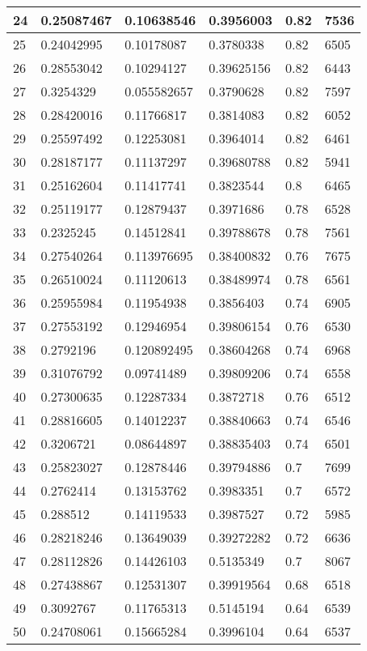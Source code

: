 \begin{longtable}{|l|l|l|l|l|l|}
24 & 0.25087467 & 0.10638546 & 0.3956003 & 0.82 & 7536 \\ \hline 
25 & 0.24042995 & 0.10178087 & 0.3780338 & 0.82 & 6505 \\ \hline 
26 & 0.28553042 & 0.10294127 & 0.39625156 & 0.82 & 6443 \\ \hline 
27 & 0.3254329 & 0.055582657 & 0.3790628 & 0.82 & 7597 \\ \hline 
28 & 0.28420016 & 0.11766817 & 0.3814083 & 0.82 & 6052 \\ \hline 
29 & 0.25597492 & 0.12253081 & 0.3964014 & 0.82 & 6461 \\ \hline 
30 & 0.28187177 & 0.11137297 & 0.39680788 & 0.82 & 5941 \\ \hline 
31 & 0.25162604 & 0.11417741 & 0.3823544 & 0.8 & 6465 \\ \hline 
32 & 0.25119177 & 0.12879437 & 0.3971686 & 0.78 & 6528 \\ \hline 
33 & 0.2325245 & 0.14512841 & 0.39788678 & 0.78 & 7561 \\ \hline 
34 & 0.27540264 & 0.113976695 & 0.38400832 & 0.76 & 7675 \\ \hline 
35 & 0.26510024 & 0.11120613 & 0.38489974 & 0.78 & 6561 \\ \hline 
36 & 0.25955984 & 0.11954938 & 0.3856403 & 0.74 & 6905 \\ \hline 
37 & 0.27553192 & 0.12946954 & 0.39806154 & 0.76 & 6530 \\ \hline 
38 & 0.2792196 & 0.120892495 & 0.38604268 & 0.74 & 6968 \\ \hline 
39 & 0.31076792 & 0.09741489 & 0.39809206 & 0.74 & 6558 \\ \hline 
40 & 0.27300635 & 0.12287334 & 0.3872718 & 0.76 & 6512 \\ \hline 
41 & 0.28816605 & 0.14012237 & 0.38840663 & 0.74 & 6546 \\ \hline 
42 & 0.3206721 & 0.08644897 & 0.38835403 & 0.74 & 6501 \\ \hline 
43 & 0.25823027 & 0.12878446 & 0.39794886 & 0.7 & 7699 \\ \hline 
44 & 0.2762414 & 0.13153762 & 0.3983351 & 0.7 & 6572 \\ \hline 
45 & 0.288512 & 0.14119533 & 0.3987527 & 0.72 & 5985 \\ \hline 
46 & 0.28218246 & 0.13649039 & 0.39272282 & 0.72 & 6636 \\ \hline 
47 & 0.28112826 & 0.14426103 & 0.5135349 & 0.7 & 8067 \\ \hline 
48 & 0.27438867 & 0.12531307 & 0.39919564 & 0.68 & 6518 \\ \hline 
49 & 0.3092767 & 0.11765313 & 0.5145194 & 0.64 & 6539 \\ \hline 
50 & 0.24708061 & 0.15665284 & 0.3996104 & 0.64 & 6537 \\ \hline 
\end{longtable}